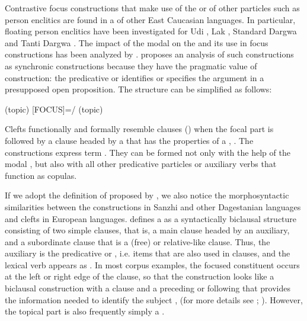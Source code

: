 Contrastive focus constructions that make use of the  or of other particles such as person enclitics are found in a  of other East Caucasian languages. In particular, floating person enclitics have been investigated for Udi \citep{Harris2001, Harris2002}, Lak \citep{Kazenin2002}, Standard Dargwa \citep{Xajdakov1986} and Tanti Dargwa \citep{Sumbatova2013}. The impact of the modal  on the  and its use in focus constructions has been analyzed by \citet{ForkerSubmittedc}. \citet{Kazenin2002} proposes an analysis of such constructions as synchronic  constructions because they have the pragmatic value of  construction: the predicative  or  identifies or specifies the argument in a presupposed open proposition. The structure can be simplified as follows:
%
\begin{exe}
	\ex	(topic) [FOCUS]=/ (topic) \label{ex:topic focus particlecopula topic}
\end{exe}

Clefts functionally and formally resemble  clauses () when the focal part is followed by a clause headed by a  that has the properties of a  ,  . The constructions express term . They can be formed not only with the help of the modal , but also with all other predicative particles or auxiliary verbs that function as copulas.

If we adopt the definition of  proposed by \citet{Lambrecht2001}, we also notice the morphosyntactic similarities between the constructions in Sanzhi and other Dagestanian languages and clefts in European languages.  defines a  as a syntactically biclausal structure consisting of two simple clauses, that is, a main clause headed by an auxiliary, and a subordinate clause that is a (free)  or relative-like clause. Thus, the auxiliary is the predicative  or , i.e. items that are also used in  clauses, and the lexical verb appears as . In most corpus examples, the focused constituent occurs at the left or right edge of the clause, so that the construction looks like a biclausal construction with a  clause and a preceding or following  that provides the information needed to identify the  subject ,   (for more details see \citealt{Kazenin2002}; \citealt{Forker2016a}). However, the topical part is also frequently simply a  .


